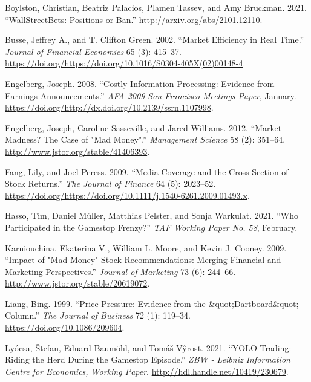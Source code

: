 \documentclass[12pt,]{article}
\begin{document}
\leavevmode\hypertarget{ref-boylston2021}{}%
Boylston, Christian, Beatriz Palacios, Plamen Tassev, and Amy Bruckman.
2021. ``WallStreetBets: Positions or Ban.''
\url{http://arxiv.org/abs/2101.12110}.

\leavevmode\hypertarget{ref-busse2002}{}%
Busse, Jeffrey A., and T. Clifton Green. 2002. ``Market Efficiency in
Real Time.'' \emph{Journal of Financial Economics} 65 (3): 415--37.
\url{https://doi.org/https://doi.org/10.1016/S0304-405X(02)00148-4}.

\leavevmode\hypertarget{ref-engelberg2008}{}%
Engelberg, Joseph. 2008. ``Costly Information Processing: Evidence from
Earnings Announcements.'' \emph{AFA 2009 San Francisco Meetings Paper},
January.
\href{https://doi.org/http://dx.doi.org/10.2139/ssrn.1107998\%20}{https://doi.org/http://dx.doi.org/10.2139/ssrn.1107998}.

\leavevmode\hypertarget{ref-engelberg2012}{}%
Engelberg, Joseph, Caroline Sasseville, and Jared Williams. 2012.
``Market Madness? The Case of "Mad Money".'' \emph{Management Science}
58 (2): 351--64. \url{http://www.jstor.org/stable/41406393}.

\leavevmode\hypertarget{ref-fang2009}{}%
Fang, Lily, and Joel Peress. 2009. ``Media Coverage and the
Cross-Section of Stock Returns.'' \emph{The Journal of Finance} 64 (5):
2023--52.
\url{https://doi.org/https://doi.org/10.1111/j.1540-6261.2009.01493.x}.

\leavevmode\hypertarget{ref-hasso2021}{}%
Hasso, Tim, Daniel Müller, Matthias Pelster, and Sonja Warkulat. 2021.
``Who Participated in the Gamestop Frenzy?'' \emph{TAF Working Paper No.
58}, February.

\leavevmode\hypertarget{ref-karniouchina2009}{}%
Karniouchina, Ekaterina V., William L. Moore, and Kevin J. Cooney. 2009.
``Impact of "Mad Money" Stock Recommendations: Merging Financial and
Marketing Perspectives.'' \emph{Journal of Marketing} 73 (6): 244--66.
\url{http://www.jstor.org/stable/20619072}.

\leavevmode\hypertarget{ref-liang1999}{}%
Liang, Bing. 1999. ``Price Pressure: Evidence from the
\&quot;Dartboard\&quot; Column.'' \emph{The Journal of Business} 72 (1):
119--34. \url{https://doi.org/10.1086/209604}.

\leavevmode\hypertarget{ref-lyocsa2021}{}%
Lyócsa, Štefan, Eduard Baumöhl, and Tomáš Vŷrost. 2021. ``YOLO Trading:
Riding the Herd During the Gamestop Episode.'' \emph{ZBW - Leibniz
Information Centre for Economics, Working Paper}.
\url{http://hdl.handle.net/10419/230679}.
\end{document}
